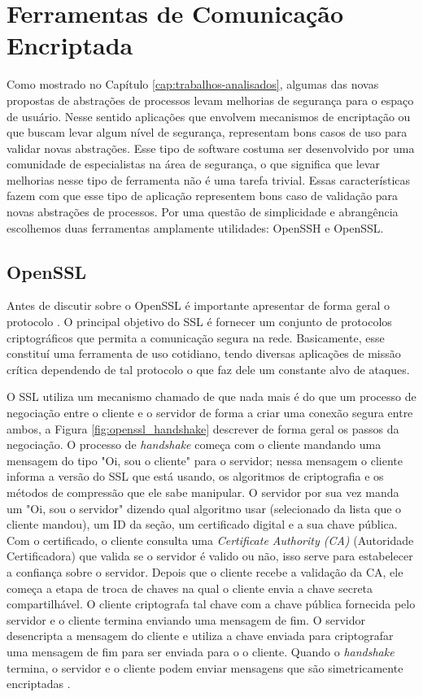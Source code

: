 \section{Ferramentas de Comunicação Encriptada}
\label{sec:com_enc}

Como mostrado no Capítulo \ref{cap:trabalhos-analisados}, algumas das novas
propostas de abstrações de processos levam melhorias de segurança para o espaço
de usuário. Nesse sentido aplicações que envolvem mecanismos de encriptação ou
que buscam levar algum nível de segurança, representam bons casos de uso para
validar novas abstrações. Esse tipo de software costuma ser desenvolvido por
uma comunidade de especialistas na área de segurança, o que significa que levar
melhorias nesse tipo de ferramenta não é uma tarefa trivial. Essas
características fazem com que esse tipo de aplicação representem bons caso de
validação para novas abstrações de processos. Por uma questão de simplicidade e
abrangência escolhemos duas ferramentas amplamente utilidades: OpenSSH e
OpenSSL.

\subsection{OpenSSL}
\label{sec:openssl}

Antes de discutir sobre o OpenSSL é importante apresentar de forma geral o
protocolo . O principal objetivo do
SSL é fornecer um conjunto de protocolos criptográficos que permita a
comunicação segura na rede. Basicamente, esse constituí uma ferramenta de uso
cotidiano, tendo diversas aplicações de missão crítica dependendo de tal
protocolo o que faz dele um constante alvo de ataques.

O SSL utiliza um mecanismo chamado de  que
nada mais é do que um processo de negociação entre o cliente e o servidor de
forma a criar uma conexão segura entre ambos, a Figura
\ref{fig:openssl_handshake} descrever de forma geral os passos da negociação. O
processo de \textit{handshake} começa com o cliente mandando uma mensagem do
tipo "Oi, sou o cliente" para o servidor; nessa mensagem o cliente informa a
versão do SSL que está usando, os algoritmos de criptografia e os métodos de
compressão que ele sabe manipular. O servidor por sua vez manda um "Oi, sou o
servidor" dizendo qual algoritmo usar (selecionado da lista que o cliente
mandou), um ID da seção, um certificado digital e a sua chave pública. Com o
certificado, o cliente consulta uma \textit{Certificate Authority (CA)}
(Autoridade Certificadora) que valida se o servidor é valido ou não, isso serve
para estabelecer a confiança sobre o servidor. Depois que o cliente recebe a
validação da CA, ele começa a etapa de troca de chaves na qual o cliente envia
a chave secreta compartilhável. O cliente criptografa tal chave com a chave
pública fornecida pelo servidor e o cliente termina enviando uma mensagem de
fim. O servidor desencripta a mensagem do cliente e utiliza a chave enviada
para criptografar uma mensagem de fim para ser enviada para o o cliente. Quando
o \textit{handshake} termina, o servidor e o cliente podem enviar mensagens que
são simetricamente encriptadas \citep{openssl}.

